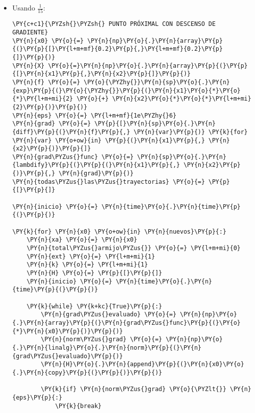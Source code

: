 \begin{itemize}
\item Usando $\frac{1}{15}$:
 \begin{tcolorbox}[breakable, size=fbox, boxrule=1pt, pad at break*=1mm,colback=cellbackground, colframe=cellborder]
\begin{Verbatim}[commandchars=\\\{\}]
\PY{c+c1}{\PYZsh{}\PYZsh{} PUNTO PRÓXIMAL CON DESCENSO DE GRADIENTE}
\PY{n}{x0} \PY{o}{=} \PY{n}{np}\PY{o}{.}\PY{n}{array}\PY{p}{(}\PY{p}{[}\PY{l+m+mf}{0.2}\PY{p}{,}\PY{l+m+mf}{0.2}\PY{p}{]}\PY{p}{)}
\PY{n}{X} \PY{o}{=}\PY{n}{np}\PY{o}{.}\PY{n}{array}\PY{p}{(}\PY{p}{[}\PY{n}{x1}\PY{p}{,}\PY{n}{x2}\PY{p}{]}\PY{p}{)}
\PY{n}{f} \PY{o}{=} \PY{o}{\PYZhy{}}\PY{n}{sp}\PY{o}{.}\PY{n}{exp}\PY{p}{(}\PY{o}{\PYZhy{}}\PY{p}{(}\PY{n}{x1}\PY{o}{*}\PY{o}{*}\PY{l+m+mi}{2} \PY{o}{+} \PY{n}{x2}\PY{o}{*}\PY{o}{*}\PY{l+m+mi}{2}\PY{p}{)}\PY{p}{)}
\PY{n}{eps} \PY{o}{=} \PY{l+m+mf}{1e\PYZhy{}6}
\PY{n}{grad} \PY{o}{=} \PY{p}{[}\PY{n}{sp}\PY{o}{.}\PY{n}{diff}\PY{p}{(}\PY{n}{f}\PY{p}{,} \PY{n}{var}\PY{p}{)} \PY{k}{for} \PY{n}{var} \PY{o+ow}{in} \PY{p}{(}\PY{n}{x1}\PY{p}{,} \PY{n}{x2}\PY{p}{)}\PY{p}{]}
\PY{n}{grad\PYZus{}func} \PY{o}{=} \PY{n}{sp}\PY{o}{.}\PY{n}{lambdify}\PY{p}{(}\PY{p}{(}\PY{n}{x1}\PY{p}{,} \PY{n}{x2}\PY{p}{)}\PY{p}{,} \PY{n}{grad}\PY{p}{)}
\PY{n}{todas\PYZus{}las\PYZus{}trayectorias} \PY{o}{=} \PY{p}{[}\PY{p}{]}

\PY{n}{inicio} \PY{o}{=} \PY{n}{time}\PY{o}{.}\PY{n}{time}\PY{p}{(}\PY{p}{)}

\PY{k}{for} \PY{n}{x0} \PY{o+ow}{in} \PY{n}{nuevos}\PY{p}{:}
    \PY{n}{xa} \PY{o}{=} \PY{n}{x0}
    \PY{n}{total\PYZus{}armijo\PYZus{}} \PY{o}{=} \PY{l+m+mi}{0}
    \PY{n}{ext} \PY{o}{=} \PY{l+m+mi}{1}
    \PY{n}{k} \PY{o}{=} \PY{l+m+mi}{1}
    \PY{n}{H} \PY{o}{=} \PY{p}{[}\PY{p}{]}
    \PY{n}{inicio} \PY{o}{=} \PY{n}{time}\PY{o}{.}\PY{n}{time}\PY{p}{(}\PY{p}{)}

    \PY{k}{while} \PY{k+kc}{True}\PY{p}{:}
        \PY{n}{grad\PYZus{}evaluado} \PY{o}{=} \PY{n}{np}\PY{o}{.}\PY{n}{array}\PY{p}{(}\PY{n}{grad\PYZus{}func}\PY{p}{(}\PY{o}{*}\PY{n}{x0}\PY{p}{)}\PY{p}{)}
        \PY{n}{norm\PYZus{}grad} \PY{o}{=} \PY{n}{np}\PY{o}{.}\PY{n}{linalg}\PY{o}{.}\PY{n}{norm}\PY{p}{(}\PY{n}{grad\PYZus{}evaluado}\PY{p}{)}
        \PY{n}{H}\PY{o}{.}\PY{n}{append}\PY{p}{(}\PY{n}{x0}\PY{o}{.}\PY{n}{copy}\PY{p}{(}\PY{p}{)}\PY{p}{)}
        
        \PY{k}{if} \PY{n}{norm\PYZus{}grad} \PY{o}{\PYZlt{}} \PY{n}{eps}\PY{p}{:}
            \PY{k}{break}
        

\end{Verbatim}
\end{tcolorbox}
\end{itemize}
